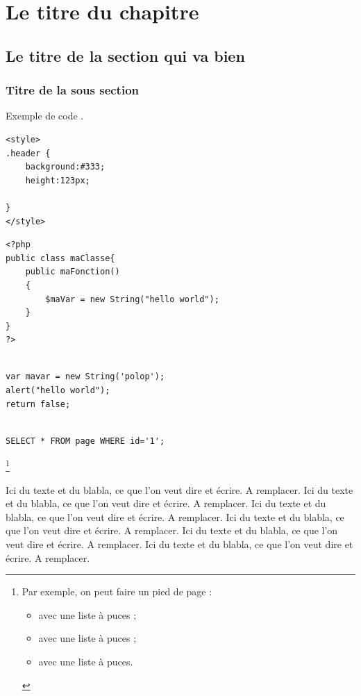 \chapter{Le titre du chapitre}

\section{Le titre de la section qui va bien}

\subsection{Titre de la sous section}

Exemple de code .
\lstset{language=HTML}
\begin{lstlisting}[label=some-css,caption=Some Html]
<style>
.header {
	background:#333;
	height:123px;

}
</style>

\end{lstlisting}
\lstset{language=PHP}
\begin{lstlisting}[label=some-php,caption=Some Php]
<?php
public class maClasse{
	public maFonction()
	{
		$maVar = new String("hello world");	
	}
}
?>

\end{lstlisting}
\lstset{language=JavaScript}
\begin{lstlisting}[label=some-js,caption=Some JavaScript]

var mavar = new String('polop');
alert("hello world");
return false;

\end{lstlisting}

\lstset{language=SQL}
\begin{lstlisting}[label=some-sql,caption=Some SQL]

SELECT * FROM page WHERE id='1';

\end{lstlisting}

\protect\footnote{Par exemple, on peut faire un pied de page :
\begin{itemize}
\item avec une liste à puces ;
\item avec une liste à puces ;
\item avec une liste à puces.
\end{itemize}
}

Ici du texte et du blabla, ce que l'on veut dire et écrire. A remplacer. Ici du texte et du blabla, ce que l'on veut dire et écrire. A remplacer. Ici du texte et du blabla, ce que l'on veut dire et écrire. A remplacer. Ici du texte et du blabla, ce que l'on veut dire et écrire. A remplacer. Ici du texte et du blabla, ce que l'on veut dire et écrire. A remplacer. Ici du texte et du blabla, ce que l'on veut dire et écrire. A remplacer.

